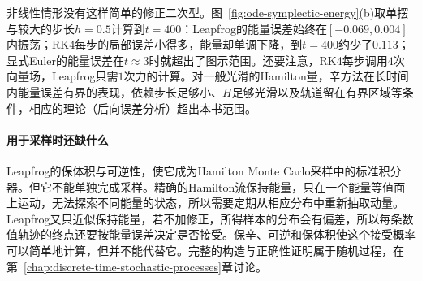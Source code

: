 非线性情形没有这样简单的修正二次型。图~\ref{fig:ode-symplectic-energy}(b)取单摆与较大的步长$h=0.5$计算到$t=400$：Leapfrog的能量误差始终在$[-0.069,0.004]$内振荡；RK4每步的局部误差小得多，能量却单调下降，到$t=400$约少了$0.113$；显式Euler的能量误差在$t\approx3$时就超出了图示范围。还要注意，RK4每步调用$4$次向量场，Leapfrog只需$1$次力的计算。对一般光滑的Hamilton量，辛方法在长时间内能量误差有界的表现，依赖步长足够小、$H$足够光滑以及轨道留在有界区域等条件，相应的理论（后向误差分析）超出本书范围。

\paragraph{用于采样时还缺什么}
Leapfrog的保体积与可逆性，使它成为Hamilton Monte Carlo采样中的标准积分器。但它不能单独完成采样。精确的Hamilton流保持能量，只在一个能量等值面上运动，无法探索不同能量的状态，所以需要定期从相应分布中重新抽取动量。Leapfrog又只近似保持能量，若不加修正，所得样本的分布会有偏差，所以每条数值轨迹的终点还要按能量误差决定是否接受。保辛、可逆和保体积使这个接受概率可以简单地计算，但并不能代替它。完整的构造与正确性证明属于随机过程，在第~\ref{chap:discrete-time-stochastic-processes}章讨论。
